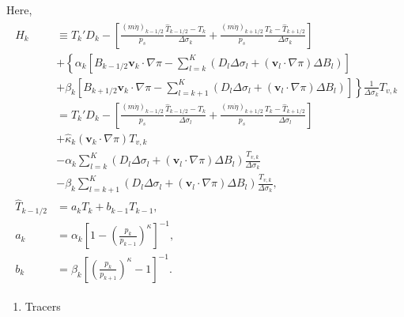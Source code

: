Here, \begin{eqnarray}
\begin{aligned}
   H_k
     &\equiv   T_k' D_k
              - \left[   \frac{(m\dot{\eta})_{k-1/2}}{p_s} \frac{\hat{T}_{k-1/2} - T_k}{\Delta\sigma_k}
               + \frac{(m\dot{\eta})_{k+1/2}}{p_s} \frac{T_k - \hat{T}_{k+1/2}}{\Delta\sigma_k} \right] \\
        &+ \left\{ \alpha_k
                    \left[ B_{k-1/2} {\mathbf{v}}_k \cdot \nabla \pi
                          - \sum_{l=k}^{K}
                           (D_l \Delta \sigma_l + ({\mathbf{v}}_l \cdot \nabla \pi)\Delta B_l)
                    \right]
             \right. \\
          &+ \left. \beta_k
                     \left[ B_{k+1/2} {\mathbf{v}}_k \cdot \nabla \pi
                          - \sum_{l=k+1}^{K}
                           (D_l \Delta \sigma_l + ({\mathbf{v}}_l \cdot \nabla \pi)\Delta B_l)
                    \right]
              \right\}
              \frac{1}{\Delta \sigma_k} T_{v,k}\\
     &=  T_k' D_k
          - \left[ \frac{(m\dot{\eta})_{k-1/2}}{p_s} \frac{\hat{T}_{k-1/2} - T_k}{\Delta \sigma_l}
               + \frac{(m\dot{\eta})_{k+1/2}}{p_s} \frac{T_k - \hat{T}_{k+1/2}}{\Delta \sigma_l} \right] \\
        &+ \hat{\kappa}_k ({\mathbf{v}}_k \cdot \nabla \pi) T_{v,k} \\
        &- \alpha_k \sum_{l=k}^{K}
                           (D_l \Delta \sigma_l + ({\mathbf{v}}_l \cdot \nabla \pi)\Delta B_l)
                            \frac{T_{v,k}}{\Delta \sigma_k} \\
        &- \beta_k \sum_{l=k+1}^{K}
                           (D_l \Delta \sigma_l + ({\mathbf{v}}_l \cdot \nabla \pi)\Delta B_l)
                            \frac{T_{v,k}}{\Delta \sigma_k}, \\
  \hat{T}_{k-1/2}
   &= a_k T_k + b_{k-1} T_{k-1}, \\
  a_k  &=  \alpha_k
              \left[ 1- \left( \frac{ p_k }{ p_{k-1} }
                        \right)^{\kappa} \right]^{-1},  \\
  b_k  &=  \beta_k
              \left[ \left( \frac{ p_k }{ p_{k+1} }
                     \right)^{\kappa} - 1 \right]^{-1} .  \end{aligned}\end{eqnarray}

\begin{enumerate}
\def\labelenumi{\arabic{enumi}.}
\tightlist
\item
  Tracers
\end{enumerate}

